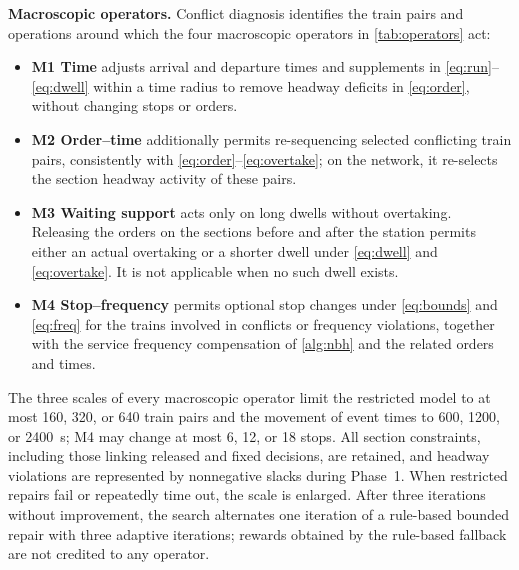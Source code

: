 \textbf{Macroscopic operators.} Conflict diagnosis identifies the train pairs and operations around which the four macroscopic operators in \cref{tab:operators} act:
\begin{itemize}
\item \textbf{M1 Time} adjusts arrival and departure times and supplements in \eqref{eq:run}--\eqref{eq:dwell} within a time radius to remove headway deficits in \eqref{eq:order}, without changing stops or orders.
\item \textbf{M2 Order--time} additionally permits re-sequencing selected conflicting train pairs, consistently with \eqref{eq:order}--\eqref{eq:overtake}; on the network, it re-selects the section headway activity of these pairs.
\item \textbf{M3 Waiting support} acts only on long dwells without overtaking. Releasing the orders on the sections before and after the station permits either an actual overtaking or a shorter dwell under \eqref{eq:dwell} and \eqref{eq:overtake}. It is not applicable when no such dwell exists.
\item \textbf{M4 Stop--frequency} permits optional stop changes under \eqref{eq:bounds} and \eqref{eq:freq} for the trains involved in conflicts or frequency violations, together with the service frequency compensation of \cref{alg:nbh} and the related orders and times.
\end{itemize}
The three scales of every macroscopic operator limit the restricted model to at most 160, 320, or 640 train pairs and the movement of event times to 600, 1200, or 2400~s; M4 may change at most 6, 12, or 18 stops. All section constraints, including those linking released and fixed decisions, are retained, and headway violations are represented by nonnegative slacks during Phase~1. When restricted repairs fail or repeatedly time out, the scale is enlarged. After three iterations without improvement, the search alternates one iteration of a rule-based bounded repair with three adaptive iterations; rewards obtained by the rule-based fallback are not credited to any operator.

